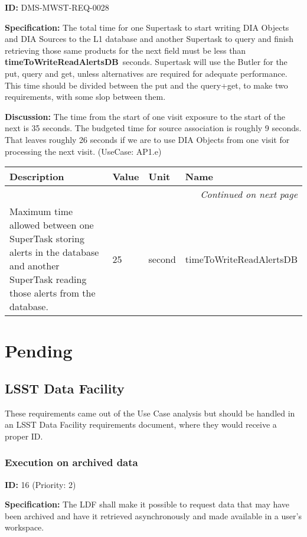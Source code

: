 \documentclass[SE,toc,lsstdraft]{lsstdoc}
\makeatletter
\newcommand{\paramname}[1]{\hspace{0pt}#1}
\newcommand{\unitname}[1]{\hspace{0pt}#1}
\newenvironment{parameters}[0]{%
\setlength\LTleft{0pt}
\setlength\LTright{\fill}
\begin{small}
\begin{longtable}[]{|p{0.49\textwidth}|l|p{0.6in}|p{1.70in}@{}|}

\hline \textbf{Description} & \textbf{Value} & \textbf{Unit} & \textbf{Name} \\ \hline
\endhead

\hline \multicolumn{4}{r}{\emph{Continued on next page}} \\
\endfoot

\hline\hline
\endlastfoot
}{%
\hline
\end{longtable}
\end{small}
}
\makeatother
\begin{document}
\label{DMS-MWST-REQ-0028}
\textbf{ID:} DMS-MWST-REQ-0028

\textbf{Specification:}
The total time for one Supertask to start writing DIA Objects and DIA Sources to the L1 database and another Supertask to query and finish retrieving those same products for the next field must be less than \textbf{timeToWriteReadAlertsDB} seconds. Supertask will use the Butler for the put, query and get, unless alternatives are required for adequate performance. This time should be divided between the put and the query+get, to make two requirements, with some slop between them.

\textbf{Discussion:}
The time from the start of one visit exposure to the start of the next is 35 seconds. The budgeted time for source association is roughly 9 seconds. That leaves roughly 26 seconds if we are to use DIA Objects from one visit for processing the next visit. (UseCase: AP1.e)

\begin{parameters}
Maximum time allowed between one SuperTask storing alerts in the database and another SuperTask reading those alerts from the database.
&
25
&
\unitname{%
second
}
&
\paramname{%
timeToWriteReadAlertsDB
} \\\hline
\end{parameters}

\section{Pending}

\subsection{LSST Data Facility}

These requirements came out of the  Use Case analysis but should be handled in an LSST Data Facility requirements document, where they would receive a proper ID.

\subsubsection{Execution on archived data}

\label{16}
\textbf{ID:} 16 (Priority: 2)

\textbf{Specification:}
The LDF shall make it possible to request data that may have been archived and have it retrieved asynchronously and made available in a user's workspace.
\end{document}
